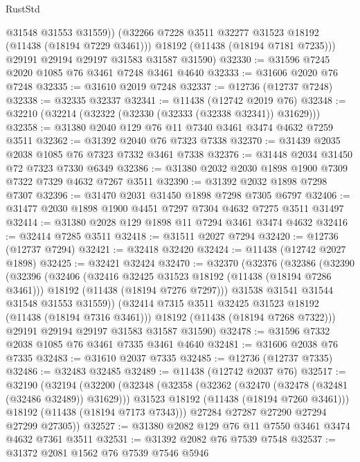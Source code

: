 \begin{lexlean}{RustStd}
\begin{coremodule}
            @31548
            @31553
            @31559))
        (@32266 @7228 @3511 @32277 @31523 @18192 (@11438 (@18194 @7229 @3461)))
        @18192
        (@11438 (@18194 @7181 @7235)))
      @29191
      @29194
      @29197
      @31583
      @31587
      @31590)
@32330 := @31596 @7245 @2020 @1085 @76 @3461 @7248 @3461 @4640
@32333 := @31606 @2020 @76 @7248
@32335 := @31610 @2019 @7248
@32337 := @12736 (@12737 @7248)
@32338 := @32335 @32337
@32341 := @11438 (@12742 @2019 @76)
@32348 := @32210 (@32214 (@32322 (@32330 (@32333 (@32338 @32341)) @31629)))
@32358 := @31380 @2040 @129 @76 @11 @7340 @3461 @3474 @4632 @7259 @3511
@32362 := @31392 @2040 @76 @7323 @7338
@32370 := @31439 @2035 @2038 @1085 @76 @7323 @7332 @3461 @7338
@32376 := @31448 @2034 @31450 @72 @7323 @7330 @6349
@32386 := @31380 @2032 @2030 @1898 @1900 @7309 @7322 @7329 @4632 @7267 @3511
@32390 := @31392 @2032 @1898 @7298 @7307
@32396 := @31470 @2031 @31450 @1898 @7298 @7305 @6797
@32406 := @31477 @2030 @1898 @1900 @4451 @7297 @7304 @4632 @7275 @3511 @31497
@32414 := @31380 @2028 @129 @1898 @11 @7294 @3461 @3474 @4632
@32416 := @32414 @7285 @3511
@32418 := @31511 @2027 @7294
@32420 := @12736 (@12737 @7294)
@32421 := @32418 @32420
@32424 := @11438 (@12742 @2027 @1898)
@32425 := @32421 @32424
@32470 := @32370
    (@32376
      (@32386
        (@32390
          (@32396
            (@32406
              (@32416 @32425 @31523 @18192 (@11438 (@18194 @7286 @3461)))
              @18192
              (@11438 (@18194 @7276 @7297)))
            @31538
            @31541
            @31544
            @31548
            @31553
            @31559))
        (@32414 @7315 @3511 @32425 @31523 @18192 (@11438 (@18194 @7316 @3461)))
        @18192
        (@11438 (@18194 @7268 @7322)))
      @29191
      @29194
      @29197
      @31583
      @31587
      @31590)
@32478 := @31596 @7332 @2038 @1085 @76 @3461 @7335 @3461 @4640
@32481 := @31606 @2038 @76 @7335
@32483 := @31610 @2037 @7335
@32485 := @12736 (@12737 @7335)
@32486 := @32483 @32485
@32489 := @11438 (@12742 @2037 @76)
@32517 := @32190
    (@32194
      (@32200
        (@32348
          (@32358
            (@32362 (@32470 (@32478 (@32481 (@32486 @32489)) @31629)))
            @31523
            @18192
            (@11438 (@18194 @7260 @3461)))
          @18192
          (@11438 (@18194 @7173 @7343)))
        @27284
        @27287
        @27290
        @27294
        @27299
        @27305))
@32527 := @31380 @2082 @129 @76 @11 @7550 @3461 @3474 @4632 @7361 @3511
@32531 := @31392 @2082 @76 @7539 @7548
@32537 := @31372 @2081 @1562 @76 @7539 @7546 @5946

\end{coremodule}
\end{lexlean}
